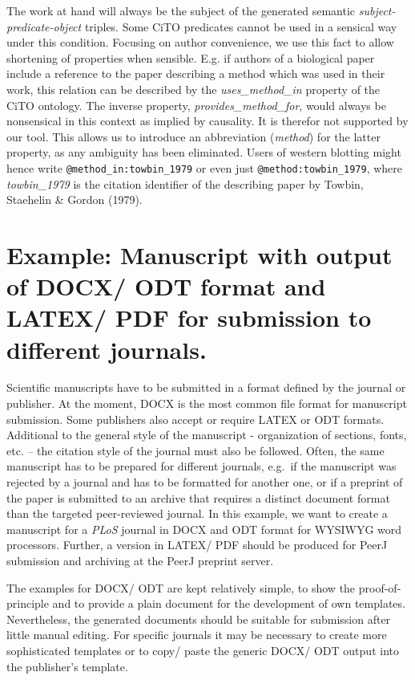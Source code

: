 \documentclass[10pt,fleqn]{wlpeerj}
\begin{document}
The work at hand will always be the subject of the generated semantic
\emph{subject-predicate-object} triples. Some CiTO predicates cannot be
used in a sensical way under this condition. Focusing on author
convenience, we use this fact to allow shortening of properties when
sensible. E.g. if authors of a biological paper include a reference to
the paper describing a method which was used in their work, this
relation can be described by the \emph{uses\_method\_in} property of the
CiTO ontology. The inverse property, \emph{provides\_method\_for}, would
always be nonsensical in this context as implied by causality. It is
therefor not supported by our tool. This allows us to introduce an
abbreviation (\emph{method}) for the latter property, as any ambiguity
has been eliminated. Users of western blotting might hence write
\texttt{@method\_in:towbin\_1979} or even just
\texttt{@method:towbin\_1979}, where \emph{towbin\_1979} is the citation
identifier of the describing paper by Towbin, Staehelin \& Gordon
(1979).

\section{Example: Manuscript with output of DOCX/ ODT format and LATEX/
PDF for submission to different
journals.}\label{example-manuscript-with-output-of-docx-odt-format-and-latex-pdf-for-submission-to-different-journals.}

Scientific manuscripts have to be submitted in a format defined by the
journal or publisher. At the moment, DOCX is the most common file format
for manuscript submission. Some publishers also accept or require LATEX
or ODT formats. Additional to the general style of the manuscript -
organization of sections, fonts, etc. -- the citation style of the
journal must also be followed. Often, the same manuscript has to be
prepared for different journals, e.g.~if the manuscript was rejected by
a journal and has to be formatted for another one, or if a preprint of
the paper is submitted to an archive that requires a distinct document
format than the targeted peer-reviewed journal. In this example, we want
to create a manuscript for a \emph{PLoS} journal in DOCX and ODT format
for WYSIWYG word processors. Further, a version in LATEX/ PDF should be
produced for PeerJ submission and archiving at the PeerJ preprint
server.

The examples for DOCX/ ODT are kept relatively simple, to show the
proof-of-principle and to provide a plain document for the development
of own templates. Nevertheless, the generated documents should be
suitable for submission after little manual editing. For specific
journals it may be necessary to create more sophisticated templates or
to copy/ paste the generic DOCX/ ODT output into the publisher's
template.
\end{document}
